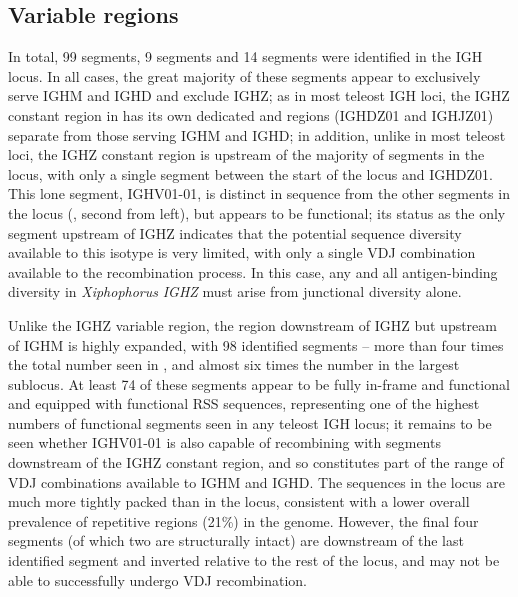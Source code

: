 	
	\subsection{Variable regions}
	
	In total, 99 \vh segments, 9 \dh segments and 14 \jh segments were identified in the \Xma IGH locus. In all cases, the great majority of these segments appear to exclusively serve IGHM and IGHD and exclude IGHZ; as in most teleost IGH loci, the IGHZ constant region in \Xma has its own dedicated \dh and \jh regions (IGHDZ01 and IGHJZ01) separate from those serving IGHM and IGHD; %
in addition, unlike in most teleost loci, the \Xma IGHZ constant region is upstream of the majority of \vh segments in the locus, with only a single \vh segment between the start of the locus and IGHDZ01. This lone \vh segment, IGHV01-01, is distinct in sequence from the other \vh segments in the locus (, second from left), but appears to be functional; its status as the only \vh segment upstream of IGHZ indicates that the potential sequence diversity available to this isotype is very limited, with only a single VDJ combination available to the recombination process. In this case, any and all antigen-binding diversity in \textit{Xiphophorus} \textit{IGHZ} must arise from junctional diversity alone. 

	Unlike the IGHZ variable region, the \vh region downstream of IGHZ but upstream of IGHM is highly expanded, with 98 identified \vh segments -- more than four times the total number seen in \Nfu, and almost six times the number in the largest \Nfu sublocus. At least 74 of these \vh segments appear to be fully in-frame and functional and equipped with functional RSS sequences, representing one of the highest numbers of functional \vh segments seen in any teleost IGH locus; it remains to be seen whether IGHV01-01 is also capable of recombining with \dh segments downstream of the IGHZ constant region, and so constitutes part of the range of VDJ combinations available to IGHM and IGHD. The \vh sequences in the \Xma locus are much more tightly packed than in the \Nfu locus, consistent with a lower overall prevalence of repetitive regions (21\%) in the \Xma genome. However, the final four \vh segments (of which two are structurally intact) are downstream of the last identified \dh segment and inverted relative to the rest of the locus, and may not be able to successfully undergo VDJ recombination. 
	
